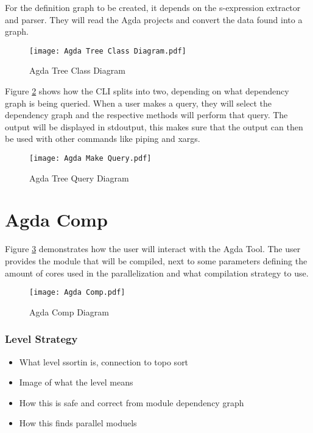 For the definition graph to be created, it depends on the s-expression
extractor and parser. They will read the Agda projects and convert the data
found into a graph.

\begin{figure}[H]
    \centering
    \label{fig:Agda Tree Class Diagram}
    \texttt{[image: Agda Tree Class Diagram.pdf]}
    \caption{Agda Tree Class Diagram}
\end{figure} 
    
\pagebreak

Figure \ref{fig:Agda Tree Query Diagram} shows how the CLI splits into two,
depending on what dependency graph is being queried. When a user makes a query,
they will select the dependency graph and the respective methods will perform
that query. The output will be displayed in stdoutput, this makes sure that the
output can then be used with other commands like piping and xargs.

\begin{figure}[H]
    \centering
    \label{fig:Agda Tree Query Diagram}
    \texttt{[image: Agda Make Query.pdf]}
    \caption{Agda Tree Query Diagram}
\end{figure} 

\pagebreak 


\section{Agda Comp}


Figure \ref{fig:Agda Comp Diagram} demonstrates how the user will interact with
the Agda Tool. The user provides the module that will be compiled, next to some
parameters defining the amount of cores used in the parallelization and what
compilation strategy to use.
\begin{figure}[H]
    \centering 
    \label{fig:Agda Comp Diagram}
    \texttt{[image: Agda Comp.pdf]}
    \caption{Agda Comp Diagram}
\end{figure} 

\subsubsection{Level Strategy}

\begin{itemize}
\item What level ssortin is, connection to topo sort 
\item Image of what the level means 
\item How this is safe and correct from module dependency graph 
\item How this finds parallel moduels
\end{itemize}


